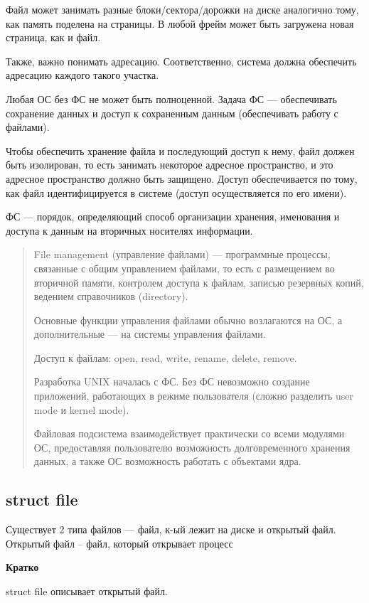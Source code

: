 Файл может занимать разные блоки/сектора/дорожки на диске аналогично тому, как память поделена на страницы. В любой фрейм может быть загружена новая страница, как и файл. 

Также, важно понимать адресацию. Соответственно, система должна обеспечить адресацию каждого такого участка.

Любая ОС без ФС не может быть полноценной. Задача ФС --- обеспечивать сохранение данных и доступ к сохраненным данным (обеспечивать работу с файлами).

Чтобы обеспечить хранение файла и последующий доступ к нему, файл должен быть изолирован, то есть занимать некоторое адресное пространство, и это адресное пространство должно быть защищено. Доступ обеспечивается по тому, как файл идентифицируется в системе (доступ осуществляется по его имени).

ФС --- порядок, определяющий способ организации хранения, именования и доступа к данным на вторичных носителях информации.

\begin{quote}
	File management (управление файлами) --- программные процессы, связанные с общим управлением файлами, то есть с размещением во вторичной памяти, контролем доступа к файлам, записью резервных копий, ведением справочников (directory).
	
	Основные функции управления файлами обычно возлагаются на ОС, а дополнительные --- на системы управления файлами.
	
	Доступ к файлам: open, read, write, rename, delete, remove.
	
	Разработка UNIX началась с ФС. Без ФС невозможно создание приложений, работающих в режиме пользователя (сложно разделить user mode и kernel mode).
	
	Файловая подсистема взаимодействует практически со всеми модулями ОС, предоставляя пользователю возможность долговременного хранения данных, а также ОС возможность работать с объектами ядра.
\end{quote}

\subsection{struct file}

Существует 2 типа файлов --- файл, к-ый лежит на диске и открытый файл. Открытый файл -- файл, который открывает процесс

\textbf{Кратко}

struct file описывает открытый файл.

